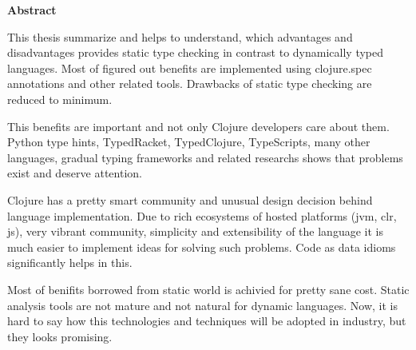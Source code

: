 \begin{center}
\textbf{\large Abstract}
\end{center}

This thesis summarize and helps to understand, which advantages and
disadvantages provides static type checking in contrast to dynamically typed
languages. Most of figured out benefits are implemented using clojure.spec
annotations and other related tools. Drawbacks of static type checking are
reduced to minimum.

This benefits are important and not only Clojure developers care about them.
Python type hints, TypedRacket, TypedClojure, TypeScripts, many other languages,
gradual typing frameworks and related researchs shows that problems exist and
deserve attention.

Clojure has a pretty smart community and unusual design decision behind language
implementation. Due to rich ecosystems of hosted platforms (jvm, clr, js), very
vibrant community, simplicity and extensibility of the language it is much
easier to implement ideas for solving such problems. Code as data idioms
significantly helps in this.

Most of benifits borrowed from static world is achivied for pretty sane cost.
Static analysis tools are not mature and not natural for dynamic languages. Now,
it is hard to say how this technologies and techniques will be adopted in
industry, but they looks promising.
